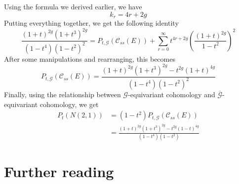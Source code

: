 Using the formula we derived earlier, we have
\[
k_r = 4r + 2g
\]
Putting everything together, we get the following identity
\[
\frac{(1+t)^{2g}(1+t^3)^{2g}}{(1-t^4)(1-t^2)^2} = P_{t,\mathscr{G}}(\mathscr{C}_{ss}(E))
+ \sum_{r=0}^\infty t^{4r+2g}\left(\frac{(1+t)^{2g}}{1-t^2}\right)^2
\]
After some manipulations and rearranging, this becomes
\[
P_{t, \mathscr{G}}(\mathscr{C}_{ss}(E))
= \frac{(1+t)^{2g}(1+t^3)^{2g}-t^{2g}(1+t)^{4g}}{(1-t^4)(1-t^2)^2}
\]
Finally, using the relationship between $\mathscr{G}$-equivariant cohomology
and $\overline{\mathscr{G}}$-equivariant cohomology, we get
\begin{align*}
P_t(N(2,1)) &= (1-t^2)P_{t,\mathscr{G}}(\mathscr{C}_{ss}(E)) \\
&= \frac{(1+t)^{2g}(1+t^3)^{2g} - t^{2g}(1-t)^{4g}}{(1-t^4)(1-t^2)}
\end{align*}
%
\section{Further reading}
%